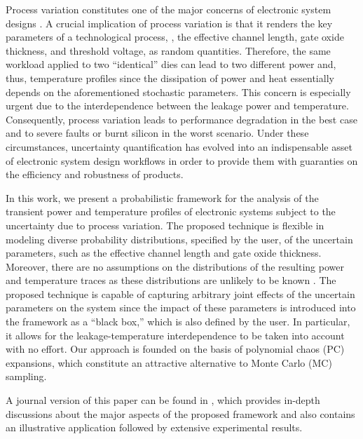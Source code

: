 Process variation constitutes one of the major concerns of electronic system
designs \cite{srivastava2010}. A crucial implication of process variation is
that it renders the key parameters of a technological process, \eg, the
effective channel length, gate oxide thickness, and threshold voltage, as random
quantities. Therefore, the same workload applied to two ``identical'' dies can
lead to two different power and, thus, temperature profiles since the
dissipation of power and heat essentially depends on the aforementioned
stochastic parameters. This concern is especially urgent due to the
interdependence between the leakage power and temperature. Consequently, process
variation leads to performance degradation in the best case and to severe faults
or burnt silicon in the worst scenario. Under these circumstances, uncertainty
quantification \cite{xiu2010} has evolved into an indispensable asset of
electronic system design workflows in order to provide them with guaranties on
the efficiency and robustness of products.

In this work, we present a probabilistic framework for the analysis of the
transient power and temperature profiles of electronic systems subject to the
uncertainty due to process variation. The proposed technique is flexible in
modeling diverse probability distributions, specified by the user, of the
uncertain parameters, such as the effective channel length and gate oxide
thickness. Moreover, there are no assumptions on the distributions of the
resulting power and temperature traces as these distributions are unlikely to be
known \apriori. The proposed technique is capable of capturing arbitrary joint
effects of the uncertain parameters on the system since the impact of these
parameters is introduced into the framework as a ``black box,'' which is also
defined by the user. In particular, it allows for the leakage-temperature
interdependence to be taken into account with no effort. Our approach is founded
on the basis of polynomial chaos (PC) expansions, which constitute an attractive
alternative to Monte Carlo (MC) sampling.

A journal version of this paper can be found in \cite{ukhov2014}, which provides
in-depth discussions about the major aspects of the proposed framework and also
contains an illustrative application followed by extensive experimental results.
